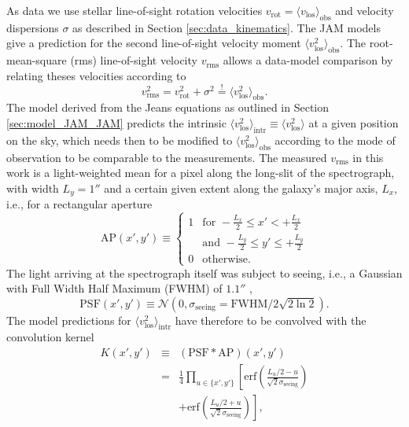 \documentclass[useAMS,usenatbib]{mnras}
\begin{document}
As data we use stellar line-of-sight rotation velocities $v_\text{rot} = \langle v_\text{los} \rangle_\text{obs}$ and velocity dispersions $\sigma$ as described in Section \ref{sec:data_kinematics}. The JAM models give a prediction for the second line-of-sight velocity moment $\langle v_\text{los}^2 \rangle_\text{obs}$. The root-mean-square (rms) line-of-sight velocity $v_\text{rms}$ allows a data-model comparison by relating theses velocities according to 
\begin{equation}
 v_\text{rms}^2 = v_\text{rot}^2 + \sigma^2  \stackrel{!}{=} \langle v_\text{los}^2 \rangle_\text{obs}.
\end{equation}
The model derived from the Jeans equations as outlined in Section \ref{sec:model_JAM_JAM} predicts the intrinsic $\langle v_\text{los}^2 \rangle_\text{intr}\equiv\langle v_\text{los}^2\rangle$ at a given position on the sky, which needs then to be modified to $\langle v_\text{los}^2 \rangle_\text{obs}$ according to the mode of observation to be comparable to the measurements. The measured $v_\text{rms}$ in this work is a light-weighted mean for a pixel along the long-slit of the spectrograph, with width $L_y = 1''$ \citep{SWELLSV} and a certain given extent along the galaxy's major axis, $L_x$, i.e., for a rectangular aperture
\begin{equation}
\text{AP}(x',y') \equiv \left\{ \begin{array}{ll} 1 & \text{for } -\frac{L_x}{2} \leq x' < + \frac{L_x}{2}\\
& \text{and } - \frac{L_y}{2} \leq y' \leq + \frac{L_y}{2}  \\ 0 & \text{otherwise.} \end{array} \right.
\end{equation}
The light arriving at the spectrograph itself was subject to seeing, i.e., a Gaussian with Full Width Half Maximum (FWHM) of $1.1''$ \citep{SWELLSV},
\begin{equation}
\text{PSF}(x',y')\equiv\mathscr{N}(0,\sigma_\text{seeing}=\text{FWHM}/2\sqrt{2\ln2}).
\end{equation}
The model predictions for $\langle v_\text{los}^2 \rangle_\text{intr}$ have therefore to be convolved with the convolution kernel
\begin{eqnarray}
K(x',y') &\equiv& (\text{PSF} \ast \text{AP})(x',y') \nonumber\\
&=& \frac{1}{4} \prod_{u \in \{x',y'\}} \left[\text{erf}\left( \frac{L_u/2 - u}{\sqrt{2}\sigma_\text{seeing}}\right) \right.\nonumber\\
 && + \left. \text{erf} \left( \frac{L_u/2 + u}{\sqrt{2} \sigma_\text{seeing}} \right) \right],
 \end{eqnarray}
\end{document}
